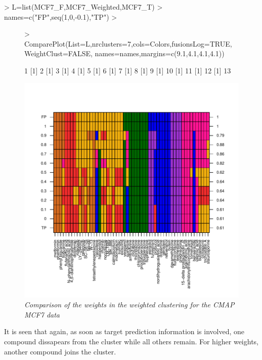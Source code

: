 \documentclass[a4paper]{article}
\begin{document}
\begin{Schunk}
\begin{Sinput}
> L=list(MCF7_F,MCF7_Weighted,MCF7_T)
> names=c("FP",seq(1,0,-0.1),"TP")
> 
\end{Sinput}
\end{Schunk}
\newpage
\begin{figure}[!h] 
\centering
\begin{Schunk}
\begin{Sinput}
> ComparePlot(List=L,nrclusters=7,cols=Colors,fusionsLog=TRUE,WeightClust=FALSE,
             names=names,margins=c(9.1,4.1,4.1,4.1))
\end{Sinput}
\begin{Soutput}
[1] 1
[1] 2
[1] 3
[1] 4
[1] 5
[1] 6
[1] 7
[1] 8
[1] 9
[1] 10
[1] 11
[1] 12
[1] 13
\end{Soutput}
\end{Schunk}
\includegraphics{IntClustVignette-ComparePlot2}
\caption{{\it Comparison of the weights in the weighted clustering for the CMAP
MCF7 data}\label{MCF7_Weights}}
\end{figure}
\noindent It is seen that again, as soon as target prediction information is
involved, one compound dissapears from the cluster while all others remain. For higher
weights, another compound joins the cluster.\\ \\
\end{document}
